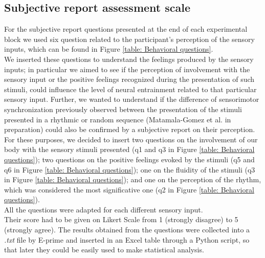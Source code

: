 \subsection*{Subjective report assessment scale}
For the subjective report questions presented at the end of each experimental block we used six question related to the participant's perception of the sensory inputs, which can be found in Figure \ref{table: Behavioral questions}. \\
We inserted these questions to understand the feelings produced by the sensory inputs; in particular we aimed to see if the perception of involvement with the sensory input or the positive feelings recognized during the presentation of such stimuli, could influence the level of neural entrainment related to that particular sensory input. Further, we wanted to understand if the difference of sensorimotor synchronization previously observed between the presentation of the stimuli presented in a rhythmic or random sequence (Matamala-Gomez et al. in preparation) could also be confirmed by a subjective report on their perception. \\
For these purposes, we decided to insert two questions on the involvement of our body with the sensory stimuli presented (q1 and q3 in Figure \ref{table: Behavioral questions}); two questions on the positive feelings evoked by the stimuli (q5 and q6 in Figure \ref{table: Behavioral questions}); one on the fluidity of the stimuli (q3 in Figure \ref{table: Behavioral questions}); and one on the perception of the rhythm, which was considered the most significative one (q2 in Figure \ref{table: Behavioral questions}).  \\
All the questions were adapted for each different sensory input. \\
Their score had to be given on Likert Scale from 1 (strongly disagree) to 5 (strongly agree). The results obtained from the questions were collected into a \textit{.txt} file by E-prime and inserted in an Excel table through a Python script, so that later they could be easily used to make statistical analysis. 

